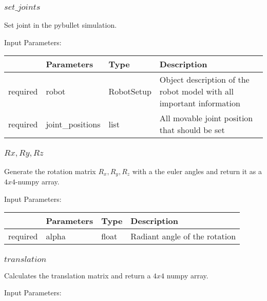 \documentclass[
	ngerman,
	accentcolor=9c,%
	type=intern,
	marginpar=false
	]{tudapub}
\begin{document}
\vspace{0.2cm}
\subsubsection{$set\_joints$}
\noindent Set joint in the pybullet simulation.

\vspace{0.5cm}
\noindent Input Parameters:
\vspace{0.5cm}

\begin{tabular}{|p{}|p{}|p{}| p{}|}
\hline
 & \textbf{Parameters} & \textbf{Type} & \textbf{Description} \\
\hline
required & robot & RobotSetup & Object description of the robot model with all important information\\
\hline
required & joint\_positions & list & All movable joint position that should be set\\
\hline

\end{tabular}

\vspace{0.2cm}
\subsubsection{$Rx, Ry,  Rz$}
\noindent Generate the rotation matrix $R_{x}, R_{y}, R_{z}$ with a the euler angles and return it as a $4x4$-numpy array.

\vspace{0.5cm}
\noindent Input Parameters:
\vspace{0.5cm}

\begin{tabular}{|p{}|p{}|p{}| p{}|}
\hline
 & \textbf{Parameters} & \textbf{Type} & \textbf{Description} \\
\hline
required & alpha & float & Radiant angle of the rotation \\
\hline
\end{tabular}

\vspace{0.2cm}
\subsubsection{$translation$}
\noindent Calculates the translation matrix and return a $4x4$ numpy array.

\vspace{0.5cm}
\noindent Input Parameters:
\vspace{0.5cm}
\end{document}
